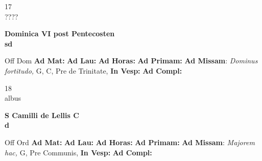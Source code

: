 \documentclass[10pt, openany]{book}
\begin{document}
    \begin{center}
        \begin{minipage}{3.5in}
            \vspace{2em}
            \begin{minipage}{0.5in}
                {\Huge 17} \\
                {\normalsize ????}
            \end{minipage}
            \begin{minipage}{3.0in}
                \textbf{ \large Dominica VI post Pentecosten \\
                \textnormal{\normalsize sd}}

            \end{minipage}
            \begin{justify}Off Dom
                \textbf{Ad Mat: }
                \textbf{Ad Lau: }
                \textbf{Ad Horas: }
                \textbf{Ad Primam: }\textbf{Ad Missam}: \textit{Dominus fortitudo,} G, C, Pre de Trinitate, 
                \textbf{In Vesp: }
                \textbf{Ad Compl: }
            \end{justify}
        \end{minipage}
    \end{center}

    \begin{center}
        \begin{minipage}{3.5in}
            \vspace{2em}
            \begin{minipage}{0.5in}
                {\Huge 18} \\
                {\normalsize albus}
            \end{minipage}
            \begin{minipage}{3.0in}
                \textbf{ \large S Camilli de Lellis C \\
                \textnormal{\normalsize d}}

            \end{minipage}
            \begin{justify}Off Ord
                \textbf{Ad Mat: }
                \textbf{Ad Lau: }
                \textbf{Ad Horas: }
                \textbf{Ad Primam: }\textbf{Ad Missam}: \textit{Majorem hac,} G, Pre Communis, 
                \textbf{In Vesp: }
                \textbf{Ad Compl: }
            \end{justify}
        \end{minipage}
    \end{center}
\end{document}
